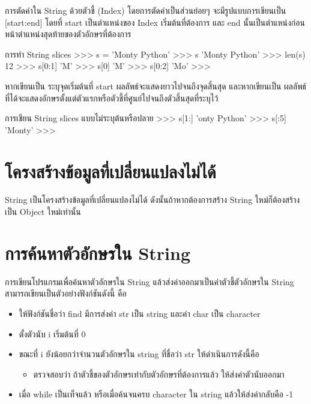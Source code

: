 การตัดคำใน String ด้วยตัวชี้ (Index) โดยการตัดคำเป็นส่วนย่อยๆ จะมีรูปแบบการเขียนเป็น [start:end] โดยที่ start เป็นตำแหน่งของ Index เริ่มต้นที่ต้องการ และ end นั้นเป็นตำแหน่งก่อนหน้าตำแหน่งสุดท้ายของตัวอักษรที่ต้องการ

\begin{codelist}{การทำ String slices}{}
>>> s = 'Monty Python'
>>> s
'Monty Python'
>>> len(s)
12
>>> s[0:1]
'M'
>>> s[0]
'M'
>>> s[0:2]
'Mo'
>>>
\end{codelist}


หากเขียนเป็น  \pyinline{[start:]} ระบุจุดเริ่มต้นที่ start ผลลัพธ์จะแสดงยาวไปจนถึงจุดสิ้นสุด และหากเขียนเป็น  \pyinline{[:end]} ผลลัพธ์ที่ได้จะแสดงอักษรตั้งแต่ตัวแรกหรือตัวชี้ที่ศูนย์ไปจนถึงตัวสิ้นสุดที่ระบุไว้

\begin{codelist}{การเชียน String slices แบบไม่ระบุต้นหรือปลาย}{}
>>> s[1:]
'onty Python'
>>> s[:5]
'Monty'
>>>
\end{codelist}


\section{โครงสร้างข้อมูลที่เปลี่ยนแปลงไม่ได้}

String เป็นโครงสร้างข้อมูลที่เปลี่ยนแปลงไม่ได้ ดังนั้นถ้าหากต้องการสร้าง String ใหม่ก็ต้องสร้างเป็น Object ใหม่เท่านั้น



\section{การค้นหาตัวอักษรใน String}

การเขียนโปรแกรมเพื่อค้นหาตัวอักษรใน String แล้วส่งค่าออกมาเป็นค่าตัวชี้ตัวอักษรใน String สามารถเขียนเป็นตัวอย่างฟังก์ชันดังนี้ คือ 

\begin{itemize}
\item ให้ฟังก์ชันชื่อว่า find มีการส่งค่า str เป็น string และค่า char เป็น character 
\item ตั้งตัวนับ i เริ่มต้นที่ 0
\item ขณะที่ i ยังน้อยกว่าจำนวนตัวอักษรใน string ที่ชื่อว่า str ให้ดำเนินการดังนี้คือ
	\begin{itemize}
		\item ตรวจสอบว่า ถ้าตัวชี้ของตัวอักษรเท่ากับตัวอักษรที่ต้องการแล้ว ให้ส่งค่าตัวนับออกมา
	\end{itemize}
\item เมื่อ while เป็นเท็จแล้ว หรือเมื่อค้นจนครบ character ใน string แล้วให้ส่งค่ากลับคือ -1
\end{itemize}

